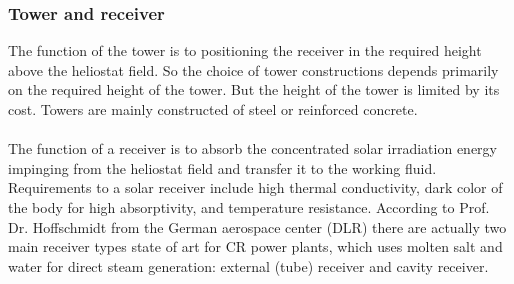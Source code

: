 \documentclass[Master,MEE,english]{twbook}%
\begin{document}
\subsubsection{Tower and receiver}
The function of the tower is to positioning the receiver in the required height above the heliostat field. So the choice of tower constructions depends primarily on the required height of the tower. But the height of the tower is limited by its cost. Towers are mainly constructed of steel or reinforced concrete. \\
\\
The function of a receiver is to absorb the concentrated solar irradiation energy impinging from the heliostat field and transfer it to the working fluid. Requirements to a solar receiver include high thermal conductivity, dark color of the body for high absorptivity, and temperature resistance. According to Prof. Dr. Hoffschmidt \cite{Hoffschmidt2014} from the German aerospace center (DLR) there are actually two main receiver types state of art for CR power plants, which uses molten salt and water for direct steam generation: external (tube) receiver and cavity receiver. 
\end{document}
